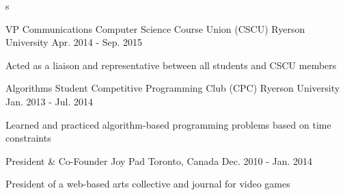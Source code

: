 s
\begin{cventries}
  \cventry
    {VP Communications}
    {Computer Science Course Union (CSCU)}
    {Ryerson University}
    {Apr. 2014 - Sep. 2015}
    {
      \begin{cvitems}
        \item {Acted as a liaison and representative between all students and CSCU members}
      \end{cvitems}
      }
   \cventry
    {Algorithms Student}
    {Competitive Programming Club (CPC)}
    {Ryerson University}
    {Jan. 2013 - Jul. 2014}
    {
      \begin{cvitems}
        \item {Learned and practiced algorithm-based programming problems based on time constraints}
      \end{cvitems}
    }
   \cventry
    {President \& Co-Founder}
    {Joy Pad}
    {Toronto, Canada}
    {Dec. 2010 - Jan. 2014}
    {
      \begin{cvitems}
        \item {President of a web-based arts collective and journal for video games}
      \end{cvitems}
    }
\end{cventries}
